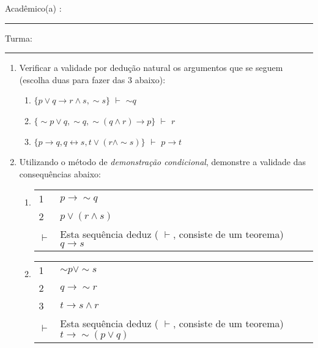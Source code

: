 \documentclass[12pt, a4paper,final]{article}
\begin{document}


\vskip 0.5cm Acad\^emico(a) : \rule{10cm}{0.4pt} Turma:  \rule{1cm}{0.4pt}
\noindent
\begin{enumerate}
\setlength{\itemsep}{-1pt}

\item Verificar a validade por dedu\c c\~ao natural os argumentos que se seguem (escolha duas para fazer das 3 abaixo):

\begin{enumerate}
\setlength{\itemsep}{-2pt} 

 \item $\{ p \vee q \rightarrow r \wedge s, \sim s \}$ {\bf $\vdash $} $\sim q$

\item $\{ \sim p \vee q, \sim q, \sim (q \wedge r) \rightarrow p \}$  {\bf $\vdash $} $r$

\item $\{p \rightarrow q, q \leftrightarrow s, t \vee (r \wedge \sim s)\}$  {\bf $\vdash $} $p \rightarrow t$
\end{enumerate}


 \item Utilizando o m\'etodo de {\em demonstra\c c\~ao condicional}, demonstre a validade das consequ\^encias abaixo:
  
\begin{enumerate}
\setlength{\itemsep}{-4pt} 
\item
 \vskip 11pt
 \begin{tabular}{ll}  %
 1 &  $  p \rightarrow \sim q$ \\    
 2 & $p \vee (r \wedge s) $ \\   
      $\vdash $ & Esta sequ\^encia deduz ( $\vdash $, consiste de um teorema) $ q \rightarrow s$
   
\end{tabular}
\item 
\vskip 11pt
\begin{tabular}{ll}  
    1 &  $ \sim p \vee \sim s $ \\   
    2 &  $ q \rightarrow \sim r$ \\   
     3 &  $ t \rightarrow s \wedge r$ \\ \hline
    $\vdash $  & Esta sequ\^encia deduz ( $\vdash $, consiste de um teorema) $ t \rightarrow \sim (p \vee q) $\end{tabular}
\end{enumerate}


\end{enumerate}
\end{document}
